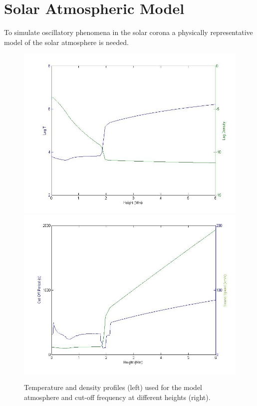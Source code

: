 \documentclass[preprint,authoryear,12pt]{elsarticle}
\begin{document}
\section{Solar Atmospheric Model}
To simulate oscillatory phenomena in the solar corona a physically representative model of the solar atmosphere is needed. 
\begin{figure}[h]
\begin{center}
\mbox{\includegraphics[scale=1.8]{imrescale/VAL3C_rho_temp_fig1L.jpg}}  
\mbox{\includegraphics[scale=1.8]{imrescale/soundspeedVAL3C_profile_fig1R.jpg}}
\par
\end{center}
\caption{Temperature and density profiles (left) used for the model atmosphere and cut-off frequency at different heights (right).}
\label{Fig1}
\end{figure}
\end{document}
